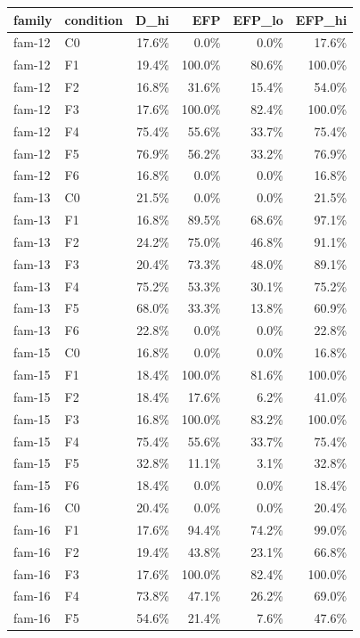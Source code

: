 \begin{tabular}{llrrrr}
\toprule
family & condition & D\_hi & EFP & EFP\_lo & EFP\_hi \\
\midrule
fam-12 & C0 & 17.6\% & 0.0\% & 0.0\% & 17.6\% \\
fam-12 & F1 & 19.4\% & 100.0\% & 80.6\% & 100.0\% \\
fam-12 & F2 & 16.8\% & 31.6\% & 15.4\% & 54.0\% \\
fam-12 & F3 & 17.6\% & 100.0\% & 82.4\% & 100.0\% \\
fam-12 & F4 & 75.4\% & 55.6\% & 33.7\% & 75.4\% \\
fam-12 & F5 & 76.9\% & 56.2\% & 33.2\% & 76.9\% \\
fam-12 & F6 & 16.8\% & 0.0\% & 0.0\% & 16.8\% \\
fam-13 & C0 & 21.5\% & 0.0\% & 0.0\% & 21.5\% \\
fam-13 & F1 & 16.8\% & 89.5\% & 68.6\% & 97.1\% \\
fam-13 & F2 & 24.2\% & 75.0\% & 46.8\% & 91.1\% \\
fam-13 & F3 & 20.4\% & 73.3\% & 48.0\% & 89.1\% \\
fam-13 & F4 & 75.2\% & 53.3\% & 30.1\% & 75.2\% \\
fam-13 & F5 & 68.0\% & 33.3\% & 13.8\% & 60.9\% \\
fam-13 & F6 & 22.8\% & 0.0\% & 0.0\% & 22.8\% \\
fam-15 & C0 & 16.8\% & 0.0\% & 0.0\% & 16.8\% \\
fam-15 & F1 & 18.4\% & 100.0\% & 81.6\% & 100.0\% \\
fam-15 & F2 & 18.4\% & 17.6\% & 6.2\% & 41.0\% \\
fam-15 & F3 & 16.8\% & 100.0\% & 83.2\% & 100.0\% \\
fam-15 & F4 & 75.4\% & 55.6\% & 33.7\% & 75.4\% \\
fam-15 & F5 & 32.8\% & 11.1\% & 3.1\% & 32.8\% \\
fam-15 & F6 & 18.4\% & 0.0\% & 0.0\% & 18.4\% \\
fam-16 & C0 & 20.4\% & 0.0\% & 0.0\% & 20.4\% \\
fam-16 & F1 & 17.6\% & 94.4\% & 74.2\% & 99.0\% \\
fam-16 & F2 & 19.4\% & 43.8\% & 23.1\% & 66.8\% \\
fam-16 & F3 & 17.6\% & 100.0\% & 82.4\% & 100.0\% \\
fam-16 & F4 & 73.8\% & 47.1\% & 26.2\% & 69.0\% \\
fam-16 & F5 & 54.6\% & 21.4\% & 7.6\% & 47.6\% \\

\end{tabular}
